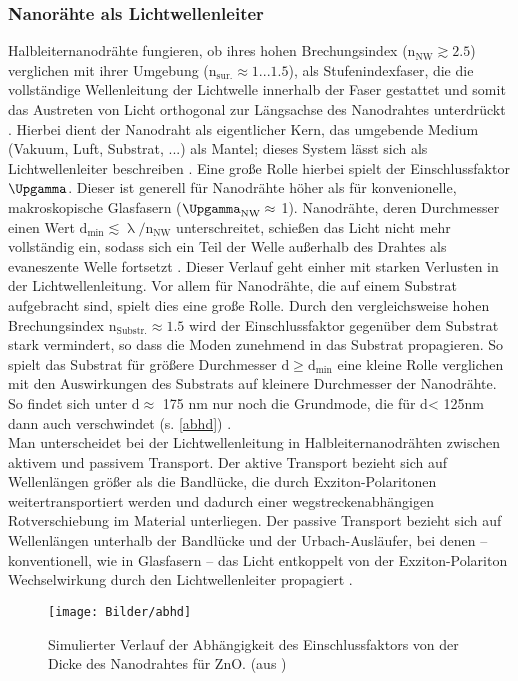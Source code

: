 \subsubsection{Nanorähte als Lichtwellenleiter}
Halbleiternanodrähte fungieren, ob ihres hohen Brechungsindex ($\text{n}_\text{NW} \gtrsim 2.5$) verglichen mit ihrer Umgebung ($\text{n}_\text{sur.} \approx 1...1.5$), als Stufenindexfaser, die die vollständige Wellenleitung der Lichtwelle innerhalb der Faser gestattet und somit das Austreten von Licht orthogonal zur Längsachse des Nanodrahtes unterdrückt \cite{Yao.2009}. Hierbei dient der Nanodraht als eigentlicher Kern, das umgebende Medium (Vakuum, Luft, Substrat, ...) als Mantel; dieses System lässt sich als Lichtwellenleiter beschreiben \cite{Pan.2005}. Eine große Rolle hierbei spielt der Einschlussfaktor $\Upgamma$. Dieser ist generell für Nanodrähte höher als für konvenionelle, makroskopische Glasfasern ($\Upgamma_\text{NW} \approx$ 1). Nanodrähte, deren Durchmesser einen Wert $\text{d}_\text{min}\lesssim \uplambda / \text{n}_\text{NW}$ unterschreitet, schießen das Licht nicht mehr vollständig ein, sodass sich ein Teil der Welle außerhalb des Drahtes als evaneszente Welle fortsetzt \cite{Voss.2007}. Dieser Verlauf geht einher mit starken Verlusten in der Lichtwellenleitung. Vor allem für Nanodrähte, die auf einem Substrat aufgebracht sind, spielt dies eine große Rolle. Durch den vergleichsweise hohen Brechungsindex $\text{n}_\text{Substr.} \approx 1.5$ wird der Einschlussfaktor gegenüber dem Substrat stark vermindert, so dass die Moden zunehmend in das Substrat propagieren. So spielt das Substrat für größere Durchmesser $\text{d} \geq \text{d}_\text{min}$ eine kleine Rolle verglichen mit den Auswirkungen des Substrats auf kleinere Durchmesser der Nanodrähte. So findet sich unter d$\approx$ 175 nm nur noch die Grundmode, die für d< 125nm dann auch verschwindet (s. \autoref{abhd}) \cite{Roeder.Diss}.\\
Man unterscheidet bei der Lichtwellenleitung in Halbleiternanodrähten zwischen aktivem und passivem Transport. Der aktive Transport bezieht sich auf Wellenlängen größer als die Bandlücke, die durch Exziton-Polaritonen weitertransportiert werden und dadurch einer wegstreckenabhängigen Rotverschiebung im Material unterliegen\cite{Pan.2005}. Der passive Transport bezieht sich auf Wellenlängen unterhalb der Bandlücke und der Urbach-Ausläufer, bei denen – konventionell, wie in Glasfasern – das Licht entkoppelt von der Exziton-Polariton Wechselwirkung durch den Lichtwellenleiter propagiert \cite{Klingshirn.2007}.
\begin{figure}
\centering
\texttt{[image: Bilder/abhd]}
\caption[Abhängigkeit des Einschlussfaktors von der Nanodrahtdicke]{Simulierter Verlauf der Abhängigkeit des Einschlussfaktors von der Dicke des Nanodrahtes für ZnO. (aus \cite{Zimmler.2010})}
\label{abhd}
\end{figure}
